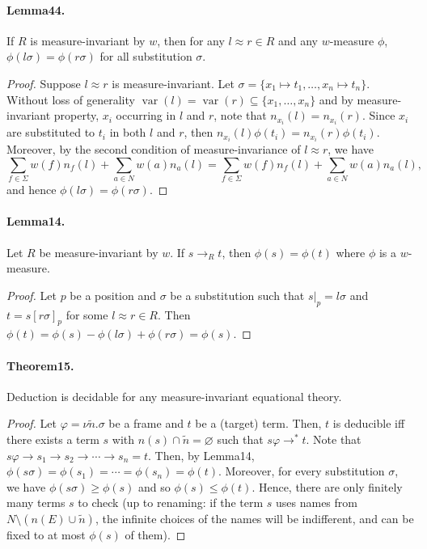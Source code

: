 \paragraph{Lemma44.} If $R$ is measure-invariant by $w$, then for any $l\approx r\in R$ and any $w$-measure $\phi$, $\phi(l\sigma)=\phi(r\sigma)$ for all substitution $\sigma$.
\begin{proof}
Suppose $l\approx r$ is measure-invariant. Let $\sigma=\{x_1\mapsto t_1,\ldots,x_n\mapsto t_n\}$. Without loss of generality $\operatorname{var}(l)=\operatorname{var}(r)\subseteq\{x_1,\ldots,x_n\}$ and by measure-invariant property, $x_i$ occurring in $l$ and $r$, note that $n_{x_i}(l)=n_{x_i}(r)$.
Since $x_i$ are substituted to $t_i$ in both $l$ and $r$, then $n_{x_i}(l)\phi(t_i)=n_{x_i}(r)\phi(t_i)$.
Moreover, by the second condition of measure-invariance of $l\approx r$, we have
\[
\sum_{f\in\Sigma}w(f)n_f(l)+\sum_{a\in N}w(a)n_a(l)=\sum_{f\in\Sigma}w(f)n_f(l)+\sum_{a\in N}w(a)n_a(l),
\]
and hence $\phi(l\sigma)=\phi(r\sigma)$.
\end{proof}
\paragraph{Lemma14.} Let $R$ be measure-invariant by $w$. If $s\to_Rt$, then $\phi(s)=\phi(t)$ where $\phi$ is a $w$-measure.
\begin{proof}
Let $p$ be a position and $\sigma$ be a substitution such that $s|_p=l\sigma$ and $t=s[r\sigma]_p$ for some $l\approx r\in R$.
Then $\phi(t)=\phi(s)-\phi(l\sigma)+\phi(r\sigma)=\phi(s)$.
\end{proof}
\paragraph{Theorem15.} Deduction is decidable for any measure-invariant equational theory.
\begin{proof}
Let $\varphi=\nu\tilde n.\sigma$ be a frame and $t$ be a (target) term. Then, $t$ is deducible iff there exists a term $s$ with $n(s)\cap\tilde n=\varnothing$ such that $s\varphi\to^*t$.
Note that $s\varphi\to s_1\to s_2\to\cdots\to s_n=t$.
Then, by Lemma14, $\phi(s\sigma)=\phi(s_1)=\cdots=\phi(s_n)=\phi(t)$.
Moreover, for every substitution $\sigma$, we have $\phi(s\sigma)\ge\phi(s)$ and so $\phi(s)\le\phi(t)$.
Hence, there are only finitely many terms $s$ to check (up to renaming: if the term $s$ uses names from $N\setminus(n(E)\cup\tilde n)$, the infinite choices of the names will be indifferent, and can be fixed to at most $\phi(s)$ of them).
\end{proof}

